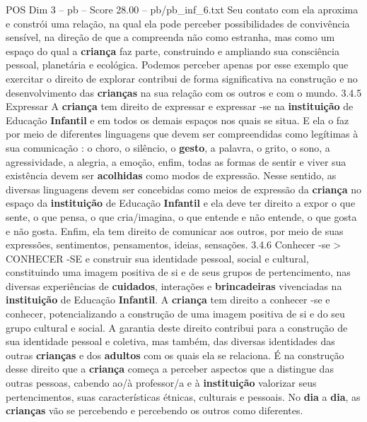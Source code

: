 \begin{textsample}{POS Dim 3 – pb – Score 28.00 – pb/pb\_inf\_6.txt}
Seu contato com ela aproxima e constrói uma relação, na qual ela pode perceber possibilidades de convivência sensível, na direção de que a compreenda não como estranha, mas como um espaço do qual a \textbf{criança} faz parte, construindo e ampliando sua consciência pessoal, planetária e ecológica.
Podemos perceber apenas por esse exemplo que exercitar o direito de explorar contribui de forma significativa na construção e no desenvolvimento das \textbf{crianças} na sua relação com os outros e com o mundo. 3.4.5 Expressar A \textbf{criança} tem direito de expressar e expressar -se na \textbf{instituição} de Educação \textbf{Infantil} e em todos os demais espaços nos quais se situa.
E ela o faz por meio de diferentes linguagens que devem ser compreendidas como legítimas à sua comunicação : o choro, o silêncio, o \textbf{gesto}, a palavra, o grito, o sono, a agressividade, a alegria, a emoção, enfim, todas as formas de sentir e viver sua existência devem ser \textbf{acolhidas} como modos de expressão.
Nesse sentido, as diversas linguagens devem ser concebidas como meios de expressão da \textbf{criança} no espaço da \textbf{instituição} de Educação \textbf{Infantil} e ela deve ter direito a expor o que sente, o que pensa, o que cria/imagina, o que entende e não entende, o que gosta e não gosta.
Enfim, ela tem direito de comunicar aos outros, por meio de suas expressões, sentimentos, pensamentos, ideias, sensações. 3.4.6 Conhecer -se > CONHECER -SE e construir sua identidade pessoal, social e cultural, constituindo uma imagem positiva de si e de seus grupos de pertencimento, nas diversas experiências de \textbf{cuidados}, interações e \textbf{brincadeiras} vivenciadas na \textbf{instituição} de Educação \textbf{Infantil}.
A \textbf{criança} tem direito a conhecer -se e conhecer, potencializando a construção de uma imagem positiva de si e do seu grupo cultural e social.
A garantia deste direito contribui para a construção de sua identidade pessoal e coletiva, mas também, das diversas identidades das outras \textbf{crianças} e dos \textbf{adultos} com os quais ela se relaciona.
É na construção desse direito que a \textbf{criança} começa a perceber aspectos que a distingue das outras pessoas, cabendo ao/à professor/a e à \textbf{instituição} valorizar seus pertencimentos, suas características étnicas, culturais e pessoais.
No \textbf{dia} a \textbf{dia}, as \textbf{crianças} vão se percebendo e percebendo os outros como diferentes.

\end{textsample}
